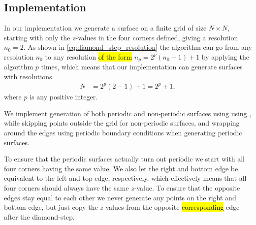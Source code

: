 \subsection{Implementation}
In our implementation we generate a surface on a finite grid of size $N\times N$, starting with only the $z$-values in the four corners defined, giving a resolution $n_0 = 2$. As shown in \cref{eq:diamond_step_resolution} the algorithm can go from any resolution $n_0$ to any resolution \hl{of the form} $n_p = 2^p(n_0-1) + 1$ by applying the algorithm $p$ times, which means that our implementation can generate surfaces with resolutions
\begin{align*}
    N &= 2^p(2-1) + 1 = 2^p + 1,
\end{align*}
where $p$ is any positive integer.

We implement generation of both periodic and non-periodic surfaces using using , while skipping points outside the grid for non-periodic surfaces, and wrapping around the edges using periodic boundary conditions when generating periodic surfaces.

To ensure that the periodic surfaces actually turn out periodic we start with all four corners having the same value. We also let the right and bottom edge be equivalent to the left and top edge, respectively, which effectively means that all four corners should always have the same $z$-value. To ensure that the opposite edges stay equal to each other we never generate any points on the right and bottom edge, but just copy the $z$-values from the opposite \hl{corresponding} edge after the diamond-step.

